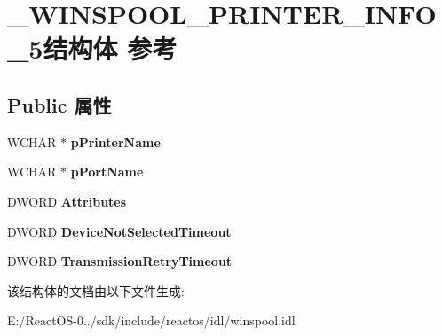 \hypertarget{struct___w_i_n_s_p_o_o_l___p_r_i_n_t_e_r___i_n_f_o__5}{}\section{\+\_\+\+W\+I\+N\+S\+P\+O\+O\+L\+\_\+\+P\+R\+I\+N\+T\+E\+R\+\_\+\+I\+N\+F\+O\+\_\+5结构体 参考}
\label{struct___w_i_n_s_p_o_o_l___p_r_i_n_t_e_r___i_n_f_o__5}
\subsection*{Public 属性}
\begin{DoxyCompactItemize}
\item 
\mbox{\label{struct___w_i_n_s_p_o_o_l___p_r_i_n_t_e_r___i_n_f_o__5_a1ad172082d81b282ec7acb6ad2622bc3}} 
W\+C\+H\+AR $\ast$ {\bfseries p\+Printer\+Name}
\item 
\mbox{\label{struct___w_i_n_s_p_o_o_l___p_r_i_n_t_e_r___i_n_f_o__5_a9d27e5171849cb335aa3d6fe34107ca2}} 
W\+C\+H\+AR $\ast$ {\bfseries p\+Port\+Name}
\item 
\mbox{\label{struct___w_i_n_s_p_o_o_l___p_r_i_n_t_e_r___i_n_f_o__5_aabbb6611ba94d7604505900f27c37bd7}} 
D\+W\+O\+RD {\bfseries Attributes}
\item 
\mbox{\label{struct___w_i_n_s_p_o_o_l___p_r_i_n_t_e_r___i_n_f_o__5_a8c9b965d1cdbfc58c964ca10f04ce33e}} 
D\+W\+O\+RD {\bfseries Device\+Not\+Selected\+Timeout}
\item 
\mbox{\label{struct___w_i_n_s_p_o_o_l___p_r_i_n_t_e_r___i_n_f_o__5_a2ae489d298d2523075c04b64f376db73}} 
D\+W\+O\+RD {\bfseries Transmission\+Retry\+Timeout}
\end{DoxyCompactItemize}


该结构体的文档由以下文件生成\+:\begin{DoxyCompactItemize}
\item 
E\+:/\+React\+O\+S-\/0../sdk/include/reactos/idl/winspool.\+idl\end{DoxyCompactItemize}
